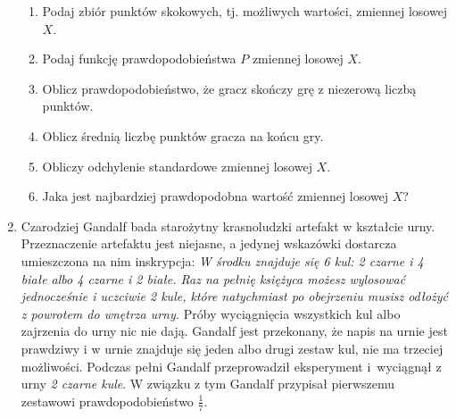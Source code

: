 \documentclass[twoside]{mwart}
\newcommand{\ans}[1]{}
\newenvironment{ansenv}{\comment}{\endcomment}
\newenvironment{ansenv}{\paragraph{Odpowiedź:}}{}
\newcommand{\ans}[1]{\begin{ansenv}#1\end{ansenv}}
\begin{document}
\begin{enumerate}
\begin{enumerate}
	\item Podaj zbiór punktów skokowych, tj. możliwych wartości, zmiennej losowej $X$.
	\ans{$\{0, 2, 4, \ldots, 2^{n}, \ldots\}=\{0\}\cup\{2^n\colon n\in\mathbb{N}_{+} \}$}
	\item Podaj funkcję prawdopodobieństwa $P$ zmiennej losowej $X$.
	\ans{
		\[
		P(X=k)=\begin{cases} 
		\left(\frac{1}{3}\right)^{n-1}\frac{1}{2} & k=2^n\, n\in\mathbb{N}_{+} \\
		\frac{1}{4} & k=0\quad \text{(wyprowadzenie niżej)}
		\end{cases} \]
	}
	\item Oblicz prawdopodobieństwo, że gracz skończy grę z niezerową liczbą punktów.
	\ans{\[P(X>0)=\sum_{n=1}^\infty \left(\frac{1}{3}\right)^{n-1}\frac{1}{2}=
		\frac{1}{2}\sum_{n=0}^\infty \left(\frac{1}{3}\right)^n = \frac{1}{2}\cdot \frac{1}{1-\frac{1}{3}}=\frac{3}{4} \]}
	\item Oblicz średnią liczbę punktów gracza na końcu gry.
	\ans{\[
		EX = \sum_{n=1}^\infty 2^{n}\left(\frac{1}{3}\right)^{n-1}\frac{1}{2} = \sum_{n=1}^\infty \left(\frac{2}{3}\right)^{n-1} = \sum_{n=0}^\infty \left(\frac{2}{3}\right)^n = \frac{1}{1-\frac{2}{3}} = 3
		\]}
	\item Obliczy odchylenie standardowe zmiennej losowej $X$.
	\ans{$DX=\sqrt{E(X^2)-(EX)^2}$ \\
		\[
		EX^2=\sum_{n=1}^\infty \left(2^{n}\right)^2\left(\frac{1}{3}\right)^{n-1}\frac{1}{2} =
		\frac{1}{2} \sum_{n=1}^\infty 4^{n}\left(\frac{1}{3}\right)^{n-1} =
		\frac{4}{2} \sum_{n=1}^\infty 4^{n-1}\left(\frac{1}{3}\right)^{n-1} =
		\frac{1}{2} \sum_{n=0}^\infty \left(\frac{4}{3}\right)^n \to\infty
		\]
		Wyciągamy z tego wniosek, że nie można obliczyć odchylenia standardowego tej zmiennej losowej.
	}
	\item Jaka jest najbardziej prawdopodobna wartość zmiennej losowej $X$? 
	\ans{2}
\end{enumerate}
	
	\item Czarodziej Gandalf bada starożytny krasnoludzki artefakt w kształcie urny.
	Przeznaczenie artefaktu jest niejasne, a jedynej wskazówki dostarcza umieszczona na nim inskrypcja: 
	\emph{W środku znajduje się 6 kul: 2 czarne i 4 białe albo 4 czarne i 2 białe.
		Raz na pełnię księżyca możesz wylosować jednocześnie i uczciwie 2 kule, które natychmiast po obejrzeniu musisz odłożyć z powrotem do wnętrza urny.}
	Próby wyciągnięcia wszystkich kul albo zajrzenia do urny nic nie dają.
	Gandalf jest przekonany, że napis na urnie jest prawdziwy i w urnie znajduje się jeden albo drugi zestaw kul, nie ma trzeciej możliwości.
	Podczas pełni Gandalf przeprowadził eksperyment i~wyciągnął z urny \emph{2 czarne kule}.
	W związku z tym Gandalf przypisał pierwszemu zestawowi prawdopodobieństwo $\frac{1}{7}$.
	

\end{enumerate}
\end{document}
